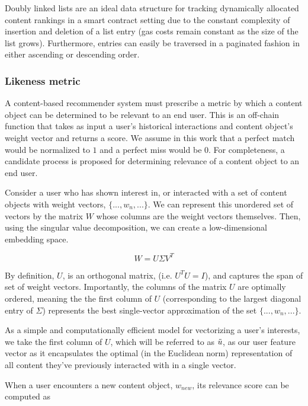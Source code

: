 Doubly linked lists are an ideal data structure for tracking dynamically allocated content rankings in a smart contract setting due to the constant complexity of insertion and deletion of a list entry (gas costs remain constant as the size of the list grows). Furthermore, entries can easily be traversed in a paginated fashion in either ascending or descending order. 

\subsubsection{Likeness metric}

A content-based recommender system must prescribe a metric by which a content object can be determined to be relevant to an end user. This is an off-chain function that takes as input a user's historical interactions and content object's weight vector and returns a score. We assume in this work that a perfect match would be normalized to $1$ and a perfect miss would be $0$. For completeness, a candidate process is proposed for determining relevance of a content object to an end user.

Consider a user who has shown interest in, or interacted with a set of content objects with weight vectors, $\{..., w_n,...\}$. We can represent this unordered set of vectors by the matrix $W$ whose columns are the weight vectors themselves. Then, using the singular value decomposition, we can create a low-dimensional embedding space.  

\begin{equation}
    W = U \Sigma V^T
\end{equation}

By definition, $U$, is an orthogonal matrix, (i.e. $U^TU = I$), and captures the span of set of weight vectors. Importantly, the columns of the matrix $U$ are optimally ordered, meaning the the first column of $U$ (corresponding to the largest diagonal entry of $\Sigma$) represents the best single-vector approximation of the set $\{..., w_n,...\}$. 

As a simple and computationally efficient model for vectorizing a user's interests, we take the first column of $U$, which will be referred to as $\Tilde{u}$, as our user feature vector as it encapsulates the optimal (in the Euclidean norm) representation of all content they've previously interacted with in a single vector.

When a user encounters a new content object, $w_{new}$, its relevance score can be computed as

